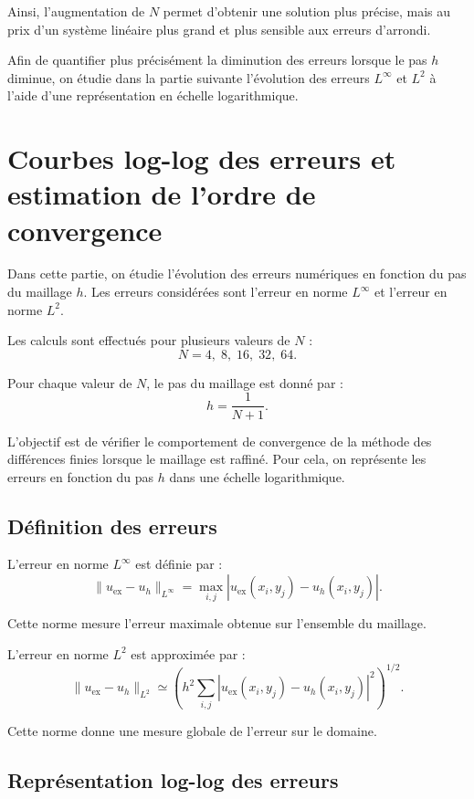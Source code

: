 \documentclass[12pt,a4paper]{article}
\begin{document}
Ainsi, l'augmentation de $N$ permet d'obtenir une solution plus précise, mais au
prix d'un système linéaire plus grand et plus sensible aux erreurs d'arrondi.

Afin de quantifier plus précisément la diminution des erreurs
lorsque le pas $h$ diminue, on étudie dans la partie suivante l'évolution des
erreurs $L^\infty$ et $L^2$ à l'aide d'une représentation en échelle logarithmique.




\section{Courbes log-log des erreurs et estimation de l'ordre de convergence}

Dans cette partie, on étudie l'évolution des erreurs numériques en fonction du
pas du maillage $h$. Les erreurs considérées sont l'erreur en norme $L^\infty$
et l'erreur en norme $L^2$.

Les calculs sont effectués pour plusieurs valeurs de $N$ :
\[
N=4,\;8,\;16,\;32,\;64.
\]

Pour chaque valeur de $N$, le pas du maillage est donné par :
\[
h=\frac{1}{N+1}.
\]

L'objectif est de vérifier le comportement de convergence de la méthode des
différences finies lorsque le maillage est raffiné. Pour cela, on représente les
erreurs en fonction du pas $h$ dans une échelle logarithmique.

\subsection{Définition des erreurs}

L'erreur en norme $L^\infty$ est définie par :
\[
\|u_{\mathrm{ex}}-u_h\|_{L^\infty}
=
\max_{i,j}
\left|u_{\mathrm{ex}}(x_i,y_j)-u_h(x_i,y_j)\right|.
\]

Cette norme mesure l'erreur maximale obtenue sur l'ensemble du maillage.

L'erreur en norme $L^2$ est approximée par :
\[
\|u_{\mathrm{ex}}-u_h\|_{L^2}
\simeq
\left(
h^2
\sum_{i,j}
\left|u_{\mathrm{ex}}(x_i,y_j)-u_h(x_i,y_j)\right|^2
\right)^{1/2}.
\]

Cette norme donne une mesure globale de l'erreur sur le domaine.

\subsection{Représentation log-log des erreurs}
\end{document}
